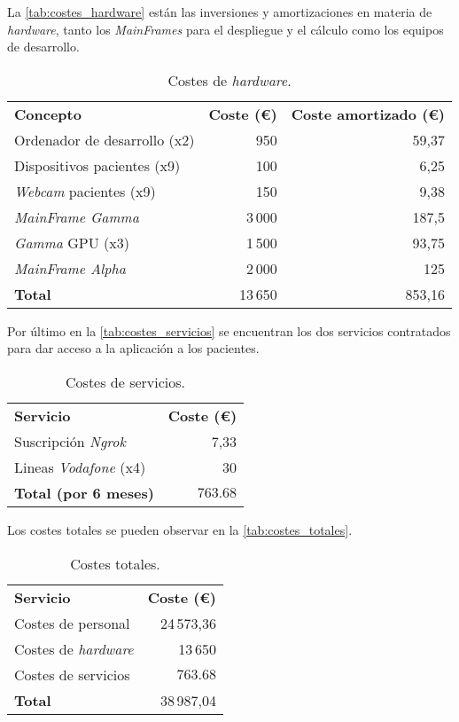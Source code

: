 La \autoref{tab:costes_hardware} están las inversiones y amortizaciones  en materia de \textit{hardware}, tanto los \textit{MainFrames} para el despliegue y el cálculo como los equipos de desarrollo.


\begin{table}[H]
	\centering
	\begin{tabular}[]{@{}l r r@{}}
		\toprule
		\textbf{Concepto} & \textbf{Coste (\euro{})} & \textbf{Coste amortizado (\euro{})} \\
		\otoprule
		Ordenador de desarrollo (x2) & 950 &  59,37\\
		Dispositivos pacientes (x9) & 100 & 6,25\\
		\textit{Webcam} pacientes (x9) & 150 &9,38\\
		\textit{MainFrame Gamma}  & 3\,000 & 187,5 \\ 
		\textit{Gamma} GPU (x3) & 1\,500 &  93,75\\
		\textit{MainFrame Alpha}  & 2\,000 & 125 \\\hubu
		\textbf{Total} & 13\,650 & 853,16\\
		\bottomrule
	\end{tabular}
	\caption{Costes de \textit{hardware}.}
	\label{tab:costes_hardware}
\end{table}

Por último en la \autoref{tab:costes_servicios} se encuentran los dos servicios contratados para dar acceso a la aplicación a los pacientes.

\begin{table}[H]
	\centering
	\begin{tabular}[]{@{}l r@{}}
		\toprule
		\textbf{Servicio} & \textbf{Coste (\euro{})}\\
		\otoprule
 		Suscripción \textit{Ngrok}  & 7,33 \\
		Lineas \textit{Vodafone} (x4) & 30 \\\hubu
		\textbf{Total (por 6 meses)} & $763.68$\\
		\bottomrule
	\end{tabular}
	\caption{Costes de servicios.}
	\label{tab:costes_servicios}
\end{table}

Los costes totales se pueden observar en la \autoref{tab:costes_totales}.

\begin{table}[H]
	\centering
	\begin{tabular}[]{@{}l r@{}}
		\toprule
		\textbf{Servicio} & \textbf{Coste (\euro{})}\\
		\otoprule
		Costes de personal  & 24\,573,36 \\
		Costes de \textit{hardware} & 13\,650 \\
		Costes de servicios & $763.68$ \\\hubu
		\textbf{Total} & 38\,987,04\\
		\bottomrule
	\end{tabular}
	\caption{Costes totales.}
	\label{tab:costes_totales}
\end{table}


